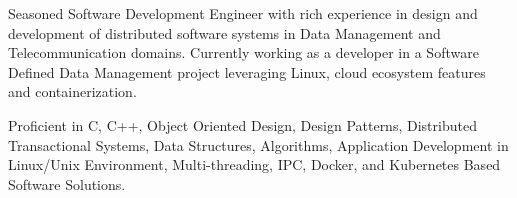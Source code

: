 

\begin{cvparagraph}

Seasoned Software Development Engineer with rich experience in design and development of distributed software systems in Data Management and Telecommunication domains. Currently working as a developer in a Software Defined Data Management project leveraging Linux, cloud ecosystem features and containerization.

Proficient in C, C++, Object Oriented Design, Design Patterns, Distributed Transactional Systems, Data Structures, Algorithms, Application Development in Linux/Unix Environment, Multi-threading, IPC, Docker, and Kubernetes Based Software Solutions.
\end{cvparagraph}
